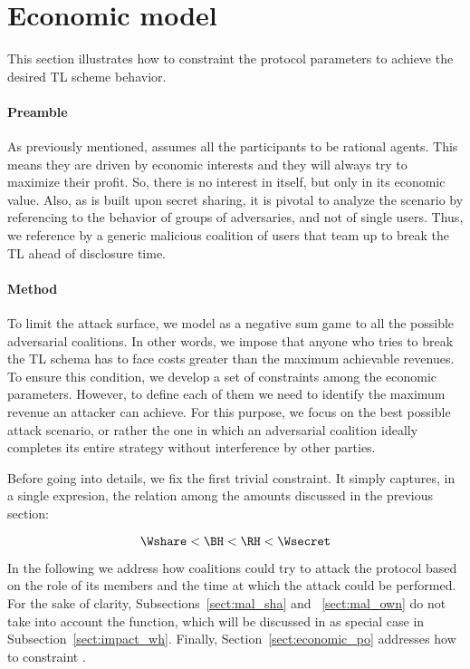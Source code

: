 \section{Economic model}\label{sect:constraints}


This section illustrates how to constraint the protocol parameters to achieve the desired TL scheme behavior.

\paragraph*{Preamble}
As previously mentioned, \shortname assumes all the participants to be rational agents. 
This means they are driven by economic interests and they will always try to maximize their profit. 
So, there is no interest in \secret itself, but only in its economic value.
%
Also, as \shortname is built upon secret sharing, it is pivotal to analyze the scenario by referencing to the behavior of groups of adversaries, and not of single users.
Thus, we reference by \coalition a generic malicious coalition of users that team up to break the TL ahead of disclosure time.

\paragraph*{Method}
To limit the attack surface, we model \shortname as a negative sum game to all the possible adversarial coalitions. 
In other words, we impose that anyone who tries to break the TL schema has to face costs greater than the maximum achievable revenues. 
To ensure this condition, we develop a set of constraints among the economic parameters.
However, to define each of them we need to identify the maximum revenue an attacker can achieve.
For this purpose, we focus on the best possible attack scenario, or rather the one in which an adversarial coalition ideally completes its entire strategy without interference by other parties.

Before going into details, we fix the first trivial constraint.
It simply captures, in a single expresion, the relation among the amounts discussed in the previous section:

\begin{equation}\label{eqbase}
\Wshare < \BH < \RH < \Wsecret
\end{equation}

In the following we address how coalitions could try to attack the protocol based on the role of its members and the time at which the attack could be performed.
For the sake of clarity, Subsections~\ref{sect:mal_sha} and ~\ref{sect:mal_own} do not take into account the \texttt{\algowhistleblowshare} function, which will be discussed in as special case in Subsection~\ref{sect:impact_wh}.
Finally, Section~\ref{sect:economic_po} addresses how to constraint \PO.


